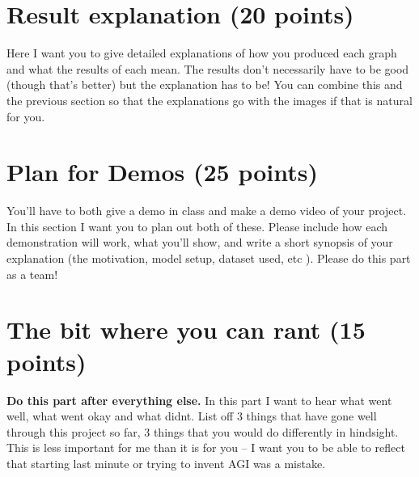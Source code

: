\documentclass{article}
\begin{document}
\section{Result explanation (20 points)}

Here I want you to give detailed explanations of how you produced each graph and what the results of each mean. The results don't necessarily have to be good (though that's better) but the explanation has to be! You can combine this and the previous section so that the explanations go with the images if that is natural for you.

\section{Plan for Demos (25 points)}

You'll have to both give a demo in class and make a demo video of your project. In this section I want you to plan out both of these. Please include how each demonstration will work, what you'll show, and write a short synopsis of your explanation (the motivation, model setup, dataset used, etc ). Please do this part as a team!

\section{The bit where you can rant (15 points)} \textbf{Do this part after everything else.} In this part I want to hear what went well, what went okay and what didnt. List off 3 things that have gone well through this project so far, 3 things that you would do differently in hindsight. This is less important for me than it is for you -- I want you to be able to reflect that starting last minute or trying to invent AGI was a mistake.  
\end{document}
